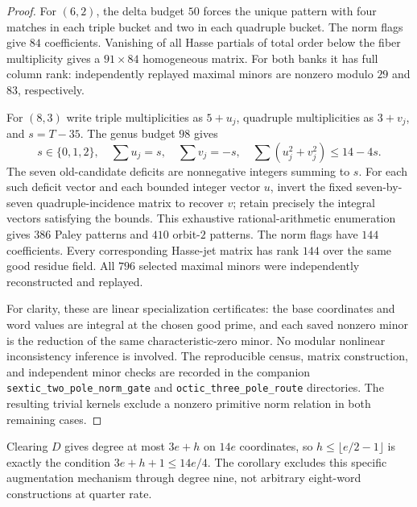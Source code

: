\begin{proof}
For $(6,2)$, the delta budget $50$ forces the unique pattern with
four matches in each triple bucket and two in each quadruple bucket.
The norm flags give $84$ coefficients.  Vanishing of all Hasse
partials of total order below the fiber multiplicity gives a
$91\times84$ homogeneous matrix.  For both banks it has full column
rank: independently replayed maximal minors are nonzero modulo
$29$ and $83$, respectively.

For $(8,3)$ write triple multiplicities as $5+u_j$, quadruple
multiplicities as $3+v_j$, and $s=T-35$.  The genus budget $98$ gives
\[
 s\in\{0,1,2\},\quad
 \sum u_j=s,\quad\sum v_j=-s,\quad
 \sum(u_j^2+v_j^2)\le14-4s.
\]
The seven old-candidate deficits are nonnegative integers summing to
$s$.  For each such deficit vector and each bounded integer vector
$u$, invert the fixed seven-by-seven quadruple-incidence matrix to
recover $v$; retain precisely the integral vectors satisfying the
bounds.  This exhaustive rational-arithmetic enumeration gives
$386$ Paley patterns and $410$ orbit-$2$ patterns.  The norm flags
have $144$ coefficients.  Every corresponding Hasse-jet matrix has
rank $144$ over the same good residue field.  All $796$ selected
maximal minors were independently reconstructed and replayed.

For clarity, these are linear specialization certificates: the base
coordinates and word values are integral at the chosen good prime,
and each saved nonzero minor is the reduction of the same
characteristic-zero minor.  No modular nonlinear inconsistency
inference is involved.  The reproducible census, matrix construction,
and independent minor checks are recorded in the companion
\texttt{sextic\_two\_pole\_norm\_gate} and
\texttt{octic\_three\_pole\_route} directories.
The resulting trivial kernels exclude a nonzero primitive norm
relation in both remaining cases.
\end{proof}

Clearing $D$ gives degree at most $3e+h$ on $14e$ coordinates, so
$h\le\lfloor e/2-1\rfloor$ is exactly the condition
$3e+h+1\le14e/4$.  The corollary excludes this specific augmentation
mechanism through degree nine, not arbitrary eight-word constructions
at quarter rate.

